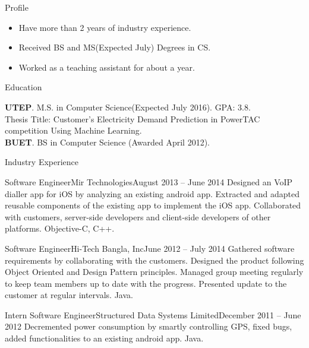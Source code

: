 \documentclass[]{mcdowellcv}
\begin{document}
	\makeheader
	
	\begin{cvsection}{Profile}
	\begin{cvsubsection}{}{}{}
		\begin{itemize}
				\item Have more than 2 years of industry experience.
				\item Received BS and MS(Expected July) Degrees in CS.
				\item Worked as a teaching assistant for about a year.
			\end{itemize}
	\end{cvsubsection}
	\end{cvsection}
	
	\begin{cvsection}{Education}
		\begin{cvsubsection}{}{}{}
				\textbf{UTEP}. M.S. in Computer Science(Expected July 2016). GPA: 3.8. \\
				Thesis Title: Customer's Electricity Demand Prediction in PowerTAC competition Using Machine Learning. \\
				\textbf{BUET}. BS in Computer Science (Awarded April 2012).  
		\end{cvsubsection}
	\end{cvsection}

	\begin{cvsection}{Industry Experience}
		
		\begin{cvsubsection}{Software Engineer}{Mir Technologies}{August 2013 -- June 2014}
		Designed an VoIP dialler app for iOS by analyzing an existing android app. Extracted and adapted reusable components of the existing app to implement the iOS app. Collaborated with customers, server-side developers and client-side developers of other platforms. Objective-C, C++.
\end{cvsubsection}		
		\begin{cvsubsection}{Software Engineer}{Hi-Tech Bangla, Inc}{June 2012 -- July 2014}	
 Gathered software requirements by collaborating with the customers. Designed the product following Object Oriented and Design Pattern principles. Managed  group meeting regularly to keep  team members up to date with the progress. Presented  update to the customer at regular intervals. Java.
			
		\end{cvsubsection}

		\begin{cvsubsection}{Intern Software Engineer}{Structured Data Systems Limited}{December 2011 -- June 2012}	
			Decremented power consumption by smartly controlling GPS, fixed bugs, added functionalities to an existing android app. Java.
		\end{cvsubsection}
	\end{cvsection}
	
\end{document}
